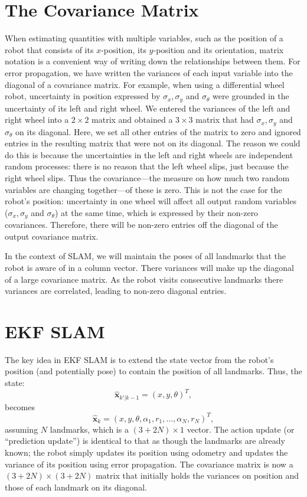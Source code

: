 \section{The Covariance Matrix}
When estimating quantities with multiple variables, such as the position of a robot that consists of its $x$-position, its $y$-position and its orientation, matrix notation is a convenient way of writing down the relationships between them. For error propagation, we have written the variances of each input variable into the diagonal of a covariance matrix. For example, when using a differential wheel robot, uncertainty in position expressed by $ \sigma_x, \sigma_y$ and $ \sigma_{\theta}$ were grounded in the uncertainty of its left and right wheel. We entered the variances of the left and right wheel into a $2 \times 2$ matrix and obtained a $3 \times 3$ matrix that had $ \sigma_x, \sigma_y$ and $ \sigma_{\theta}$ on its diagonal. Here, we set all other entries of the matrix to zero and ignored entries in the resulting matrix that were not on its diagonal. The reason we could do this is because the uncertainties in the left and right wheels are independent random processes: there is no reason that the left wheel slips, just because the right wheel slips. Thus the covariance---the measure on how much two random variables are changing together---of these is zero. This is not the case for the robot's position: uncertainty in one wheel will affect all output random variables ($ \sigma_x, \sigma_y$ and $ \sigma_{\theta}$) at the same time, which is expressed by their non-zero covariances. Therefore, there will be non-zero entries off the diagonal of the output covariance matrix.

In the context of SLAM, we will maintain the poses of all landmarks that the robot is aware of in a column vector. There variances will make up the diagonal of a large covariance matrix. As the robot visits consecutive landmarks there variances are correlated, leading to non-zero diagonal entries. 

\section{EKF SLAM}\label{sec:ekfslam}\label{sec:ekfslam}
The key idea in EKF SLAM is to extend the state vector from the robot's position (and potentially pose) to contain the position of all landmarks. Thus, the state:
\begin{equation}
\hat{\boldsymbol{x}}_{k'|k-1}=(x,y,\theta)^T,
\end{equation}
\noindent becomes
\begin{equation}
\hat{\boldsymbol{x}}_{k}=(x,y,\theta,\alpha_1,r_1,\ldots,\alpha_N,r_N)^T,
\end{equation}
\noindent assuming $ N$ landmarks, which is a $(3+2N)\times 1$ vector. The action update (or ``prediction update'') is identical to that as though the landmarks are already known; the robot simply updates its position using odometry and updates the variance of its position using error propagation. The covariance matrix is now a $(3+2N) \times (3+2N)$ matrix that initially holds the variances on position and those of each landmark on its diagonal.

